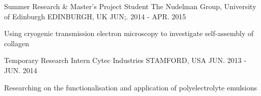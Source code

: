 \begin{cventries}
  \cventry
    {Summer Research \& Master's Project Student}
    {The Nudelman Group, University of Edinburgh}
    {EDINBURGH, UK}
    {JUN;. 2014 - APR. 2015}
    {
      \begin{cvitems}
        \item {Using cryogenic transmission electron microscopy to investigate self-assembly of collagen}
      \end{cvitems}
    }
  \cventry
    {Temporary Research Intern}
    {Cytec Industries}
    {STAMFORD, USA}
    {JUN. 2013 - JUN. 2014}
    {
      \begin{cvitems}
        \item {Researching on the functionalisation and application of polyelectrolyte emulsions}
      \end{cvitems}
    }
\end{cventries}
